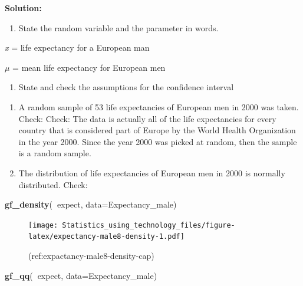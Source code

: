 \documentclass[]{book}
\newenvironment{Shaded}{\begin{snugshade}}{\end{snugshade}}
\newcommand{\DataTypeTok}[1]{\textcolor[rgb]{0.13,0.29,0.53}{#1}}
\newcommand{\KeywordTok}[1]{\textcolor[rgb]{0.13,0.29,0.53}{\textbf{#1}}}
\newcommand{\NormalTok}[1]{#1}
\newcommand{\OperatorTok}[1]{\textcolor[rgb]{0.81,0.36,0.00}{\textbf{#1}}}
\providecommand{\tightlist}{%
  \setlength{\itemsep}{0pt}\setlength{\parskip}{0pt}}
\begin{document}
\textbf{Solution:}

\begin{enumerate}
\def\labelenumi{\arabic{enumi}.}
\tightlist
\item
  State the random variable and the parameter in words.
\end{enumerate}

\emph{x} = life expectancy for a European man

\(\mu\) = mean life expectancy for European men

\begin{enumerate}
\def\labelenumi{\arabic{enumi}.}
\setcounter{enumi}{1}
\tightlist
\item
  State and check the assumptions for the confidence interval
\end{enumerate}

\begin{enumerate}
\def\labelenumi{\alph{enumi}.}
\item
  A random sample of 53 life expectancies of European men in 2000 was taken. Check: Check: The data is actually all of the life expectancies for every country that is considered part of Europe by the World Health Organization in the year 2000. Since the year 2000 was picked at random, then the sample is a random sample.
\item
  The distribution of life expectancies of European men in 2000 is normally distributed. Check:
\end{enumerate}



\begin{Shaded}
\begin{Highlighting}[]
\KeywordTok{gf_density}\NormalTok{(}\OperatorTok{~}\NormalTok{expect, }\DataTypeTok{data=}\NormalTok{Expectancy_male)}
\end{Highlighting}
\end{Shaded}

\begin{figure}
\centering
\texttt{[image: Statistics\_using\_technology\_files/figure-latex/expectancy-male8-density-1.pdf]}
\caption{\label{fig:expectancy-male8-density}(ref:expactancy-male8-density-cap)}
\end{figure}



\begin{Shaded}
\begin{Highlighting}[]
\KeywordTok{gf_qq}\NormalTok{(}\OperatorTok{~}\NormalTok{expect, }\DataTypeTok{data=}\NormalTok{Expectancy_male)}
\end{Highlighting}
\end{Shaded}
\end{document}
